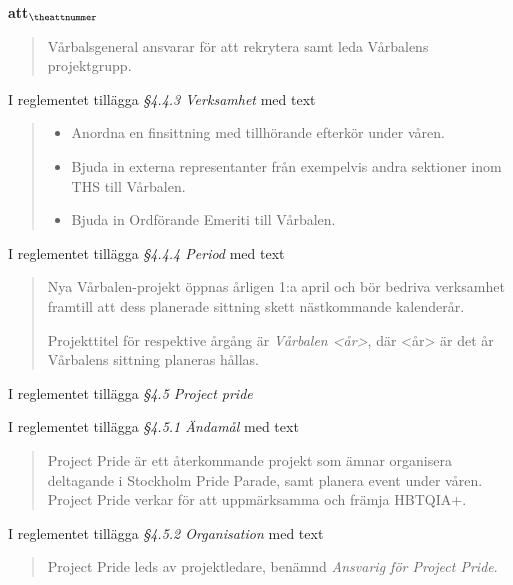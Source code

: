 \documentclass[a4paper]{article}
\begin{document}
\begin{list}{\bf att$_{\theattnummer}$}{}
\begin{quote}
        Vårbalsgeneral ansvarar för att rekrytera samt leda Vårbalens projektgrupp.
    \end{quote}
\item I reglementet tillägga \textit{\S4.4.3 Verksamhet} med text
    \begin{quote}
        \begin{itemize}
            \item Anordna en finsittning med tillhörande efterkör under våren.
            \item Bjuda in externa representanter från exempelvis andra sektioner inom THS till Vårbalen.
            \item Bjuda in Ordförande Emeriti till Vårbalen.
        \end{itemize}
    \end{quote}
\item I reglementet tillägga \textit{\S4.4.4 Period} med text
    \begin{quote}
        Nya Vårbalen-projekt öppnas årligen 1:a april och bör bedriva verksamhet framtill att dess planerade sittning skett nästkommande kalenderår.

        Projekttitel för respektive årgång är \textit{Vårbalen <år>}, där <år> är det år Vårbalens sittning planeras hållas.
    \end{quote}


\item I reglementet tillägga \textit{\S4.5 Project pride}
\item I reglementet tillägga \textit{\S4.5.1 Ändamål} med text
    \begin{quote}
        Project Pride är ett återkommande projekt som ämnar organisera
        deltagande i Stockholm Pride Parade, samt planera event under våren.
        Project Pride verkar för att uppmärksamma och främja HBTQIA+.
    \end{quote}
\item I reglementet tillägga \textit{\S4.5.2 Organisation} med text
    \begin{quote}
        Project Pride leds av projektledare, benämnd \textit{Ansvarig för Project Pride}.


\end{quote}
\end{list}
\end{document}
